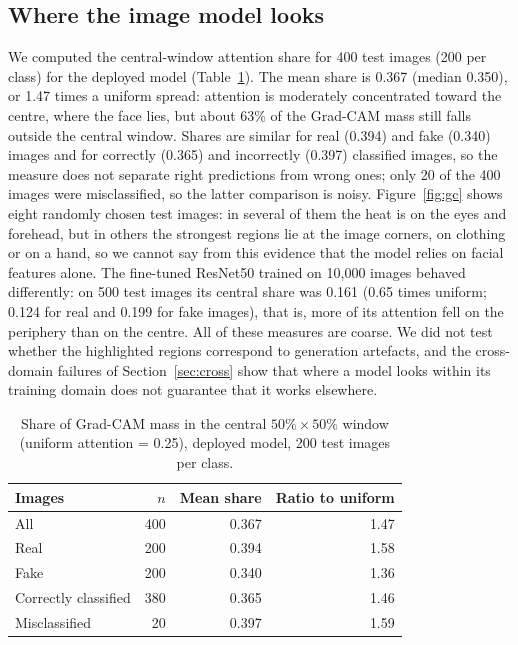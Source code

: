 \documentclass[11pt,a4paper]{article}
\begin{document}
\subsection{Where the image model looks}
We computed the central-window attention share for 400 test images (200 per class) for the deployed model (Table~\ref{tab:attn}). The mean share is 0.367 (median 0.350), or 1.47 times a uniform spread: attention is moderately concentrated toward the centre, where the face lies, but about 63\% of the Grad-CAM mass still falls outside the central window. Shares are similar for real (0.394) and fake (0.340) images and for correctly (0.365) and incorrectly (0.397) classified images, so the measure does not separate right predictions from wrong ones; only 20 of the 400 images were misclassified, so the latter comparison is noisy. Figure~\ref{fig:gc} shows eight randomly chosen test images: in several of them the heat is on the eyes and forehead, but in others the strongest regions lie at the image corners, on clothing or on a hand, so we cannot say from this evidence that the model relies on facial features alone. The fine-tuned ResNet50 trained on 10{,}000 images behaved differently: on 500 test images its central share was 0.161 (0.65 times uniform; 0.124 for real and 0.199 for fake images), that is, more of its attention fell on the periphery than on the centre. All of these measures are coarse. We did not test whether the highlighted regions correspond to generation artefacts, and the cross-domain failures of Section~\ref{sec:cross} show that where a model looks within its training domain does not guarantee that it works elsewhere.

\begin{table}[h]
\centering
\caption{Share of Grad-CAM mass in the central $50\%\times50\%$ window (uniform attention = 0.25), deployed model, 200 test images per class.}\label{tab:attn}
\begin{tabular}{lrrr}
\toprule
Images & $n$ & Mean share & Ratio to uniform \\
\midrule
All & 400 & 0.367 & 1.47 \\
Real & 200 & 0.394 & 1.58 \\
Fake & 200 & 0.340 & 1.36 \\
Correctly classified & 380 & 0.365 & 1.46 \\
Misclassified & 20 & 0.397 & 1.59 \\
\bottomrule
\end{tabular}
\end{table}
\end{document}

